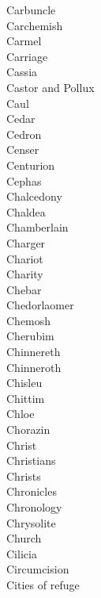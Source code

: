 Carbuncle  \\
Carchemish  \\
Carmel  \\
Carriage  \\
Cassia  \\
Castor and Pollux  \\
Caul  \\
Cedar  \\
Cedron  \\
Censer  \\
Centurion  \\
Cephas  \\
Chalcedony  \\
Chaldea  \\
Chamberlain  \\
Charger  \\
Chariot  \\
Charity  \\
Chebar  \\
Chedorlaomer  \\
Chemosh  \\
Cherubim  \\
Chinnereth  \\
Chinneroth  \\
Chisleu  \\
Chittim  \\
Chloe  \\
Chorazin  \\
Christ  \\
Christians  \\
Christs  \\
Chronicles  \\
Chronology  \\
Chrysolite  \\
Church  \\
Cilicia  \\
Circumcision  \\
Cities of refuge  \\
